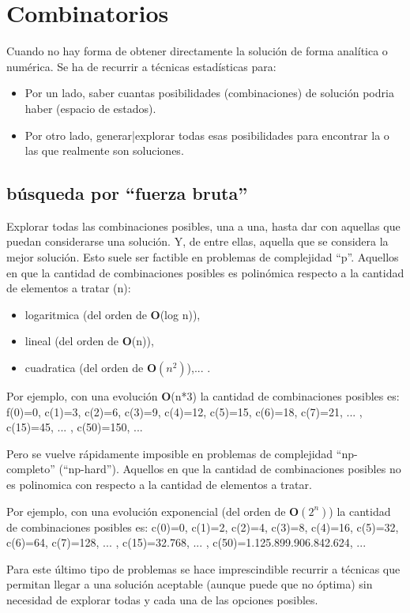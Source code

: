 \documentclass[spanish,12pt,a4paper,final,oneside]{book}
\begin{document}
\section{Combinatorios}
Cuando no hay forma de obtener directamente la solución de forma analítica o numérica. Se ha de recurrir a técnicas estadísticas para:
\begin{itemize}
\item Por un lado, saber cuantas posibilidades (combinaciones) de solución podria haber (espacio de estados).
\item Por otro lado, generar|explorar todas esas posibilidades para encontrar la o las que realmente son soluciones.
\end{itemize}

\subsection{búsqueda por ``fuerza bruta''}
Explorar todas las combinaciones posibles, una a una, hasta dar con aquellas que puedan considerarse una solución. Y, de entre ellas, aquella que se considera la mejor solución.
Esto suele ser factible en problemas de complejidad ``p''. Aquellos en que la cantidad de combinaciones posibles es polinómica respecto a la cantidad de elementos a tratar (n):
\begin{itemize}
\item logaritmica (del orden de \textbf{O}(log n)), 
\item lineal (del orden de \textbf{O}(n)), 
\item cuadratica (del orden de $\textbf{O}(n^2)$),... . 
\end{itemize}

Por ejemplo, con una evolución \textbf{O}(n*3) la cantidad de combinaciones posibles es: f(0)=0, c(1)=3, c(2)=6, c(3)=9, c(4)=12, c(5)=15, c(6)=18, c(7)=21, ... , c(15)=45, ... , c(50)=150, ...

Pero se vuelve rápidamente imposible en problemas de complejidad ``np-completo'' (``np-hard''). Aquellos en que la cantidad de combinaciones posibles no es polinomica con respecto a la cantidad de elementos a tratar. 

Por ejemplo, con una evolución exponencial (del orden de $\textbf{O}(2^n)$) la cantidad de combinaciones posibles es: c(0)=0, c(1)=2, c(2)=4, c(3)=8, c(4)=16, c(5)=32, c(6)=64, c(7)=128, ... , c(15)=32.768, ... , c(50)=1.125.899.906.842.624, ...

Para este último tipo de problemas se hace imprescindible recurrir a técnicas que permitan llegar a una solución aceptable (aunque puede que no óptima) sin necesidad de explorar todas y cada una de las opciones posibles.
\end{document}

